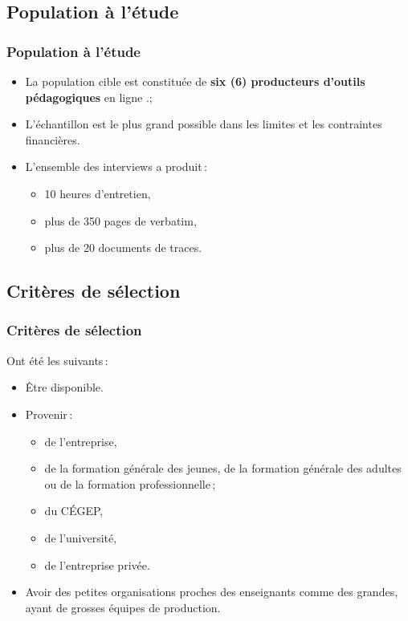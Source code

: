                      	\subsection{Population à l’étude} 
					\begin{frame}[allowframebreaks]
						\frametitle{Population à l’étude}
                        
                        			\begin{itemize} 
                       				 \item La population cible est constituée de \textbf{six (6) producteurs d’outils pédagogiques }en ligne .;										 
                       				 \item L’échantillon est le plus grand possible dans les limites et les contraintes financières.
                       		              \item L’ensemble des interviews a produit\,:
                       		              \begin{itemize} 
                       		              	\item 10 heures d’entretien,
                       		              	\item plus de 350 pages de verbatim,
                       		              	\item plus de 20 documents de traces.
                       		              \end{itemize}
                       		 \end{itemize}
                       		 \end{frame}
				\subsection{Critères de sélection} 
					\begin{frame}[allowframebreaks]
						\frametitle{Critères de sélection}
                        			Ont été les suivants\,:
                        			\begin{itemize} 
                       				\item Être disponible.
							\item Provenir\,:
							\begin{itemize}
								\item de l’entreprise, 
								\item de la formation générale des jeunes, de la formation générale des adultes ou de la formation professionnelle\,;
								\item du CÉGEP, 
								\item de l’université, 
								\item de l’entreprise privée.
							\end{itemize}
							\item Avoir des petites organisations proches des enseignants comme des grandes, ayant de grosses équipes de production.
                       		 \end{itemize}
                       		 \end{frame}
